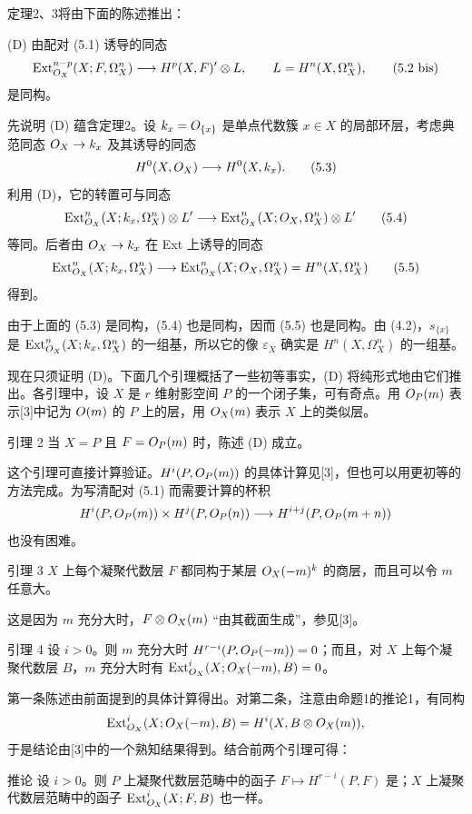 定理2、3将由下面的陈述推出：
\begin{statement}{(D)}
由配对 (5.1) 诱导的同态
\begin{equation}
\operatorname{Ext}_{O_X}^{n-p}(X;F,\Omega_X^n)
\longrightarrow H^p(X,F)'\otimes L,
\qquad L=H^n(X,\Omega_X^n),\tag{5.2 bis}
\end{equation}
是同构。
\end{statement}
先说明 (D) 蕴含定理2。设 $k_x=O_{\{x\}}$ 是单点代数簇 $x\in X$ 的局部环层，考虑典范同态 $O_X\to k_x$ 及其诱导的同态
\begin{equation}
H^0(X,O_X)\longrightarrow H^0(X,k_x).\tag{5.3}
\end{equation}
利用 (D)，它的转置可与同态
\begin{equation}
\operatorname{Ext}_{O_X}^{n}(X;k_x,\Omega_X^n)\otimes L'
\longrightarrow\operatorname{Ext}_{O_X}^{n}(X;O_X,\Omega_X^n)\otimes L'
\tag{5.4}
\end{equation}
等同。后者由 $O_X\to k_x$ 在 Ext 上诱导的同态
\begin{equation}
\operatorname{Ext}_{O_X}^{n}(X;k_x,\Omega_X^n)
\longrightarrow\operatorname{Ext}_{O_X}^{n}(X;O_X,\Omega_X^n)
=H^n(X,\Omega_X^n)\tag{5.5}
\end{equation}
得到。

由于上面的 (5.3) 是同构，(5.4) 也是同构，因而 (5.5) 也是同构。由 (4.2)，$s_{\{x\}}$ 是 $\operatorname{Ext}_{O_X}^{n}(X;k_x,\Omega_X^n)$ 的一组基，所以它的像 $\varepsilon_X$ 确实是 $H^n(X,\Omega_X^n)$ 的一组基。

现在只须证明 (D)。下面几个引理概括了一些初等事实，(D) 将纯形式地由它们推出。各引理中，设 $X$ 是 $r$ 维射影空间 $P$ 的一个闭子集，可有奇点。用 $O_P(m)$ 表示[3]中记为 $O(m)$ 的 $P$ 上的层，用 $O_X(m)$ 表示 $X$ 上的类似层。
\begin{statement}{引理 2}
当 $X=P$ 且 $F=O_P(m)$ 时，陈述 (D) 成立。
\end{statement}
这个引理可直接计算验证。$H^i(P,O_P(m))$ 的具体计算见[3]，但也可以用更初等的方法完成。为写清配对 (5.1) 而需要计算的杯积
\[
H^i(P,O_P(m))\times H^j(P,O_P(n))
\longrightarrow H^{i+j}(P,O_P(m+n))
\]
也没有困难。
\begin{statement}{引理 3}
$X$ 上每个凝聚代数层 $F$ 都同构于某层 $O_X(-m)^k$ 的商层，而且可以令 $m$ 任意大。
\end{statement}
这是因为 $m$ 充分大时，$F\otimes O_X(m)$ “由其截面生成”，参见[3]。
\begin{statement}{引理 4}
设 $i>0$。则 $m$ 充分大时 $H^{r-i}(P,O_P(-m))=0$；而且，对 $X$ 上每个凝聚代数层 $B$，$m$ 充分大时有 $\operatorname{Ext}_{O_X}^{i}(X;O_X(-m),B)=0$。
\end{statement}
第一条陈述由前面提到的具体计算得出。对第二条，注意由命题1的推论1，有同构
\[
\operatorname{Ext}_{O_X}^{i}(X;O_X(-m),B)
=H^i(X,B\otimes O_X(m)),
\]
于是结论由[3]中的一个熟知结果得到。结合前两个引理可得：
\begin{statement}{推论}
设 $i>0$。则 $P$ 上凝聚代数层范畴中的函子 $F\mapsto H^{r-i}(P,F)$ 是；$X$ 上凝聚代数层范畴中的函子 $\operatorname{Ext}_{O_X}^{i}(X;F,B)$ 也一样。
\end{statement}

